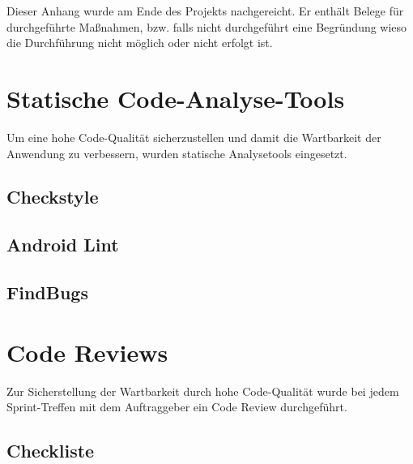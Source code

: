 
Dieser Anhang wurde am Ende des Projekts nachgereicht. Er enthält Belege für
durchgeführte Maßnahmen, bzw. falls nicht durchgeführt eine Begründung wieso
die Durchführung nicht möglich oder nicht erfolgt ist. \\

\raggedbottom


\section{Statische Code-Analyse-Tools}

Um eine hohe Code-Qualität sicherzustellen und damit die Wartbarkeit der
Anwendung zu verbessern, wurden statische Analysetools eingesetzt.

\subsection{Checkstyle}



\clearpage
\subsection{Android Lint}



\clearpage
\subsection{FindBugs}



\clearpage


\section{Code Reviews}

Zur Sicherstellung der Wartbarkeit durch hohe Code-Qualität wurde bei jedem
Sprint-Treffen mit dem Auftraggeber ein Code Review durchgeführt.


\subsection{Checkliste}

